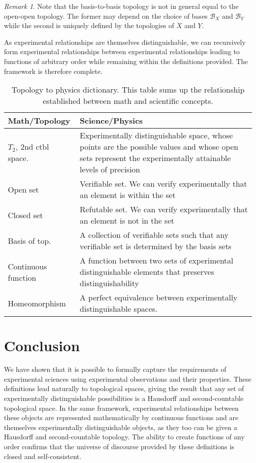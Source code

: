 \documentclass[review]{elsarticle}
\theoremstyle{plain}%
\theoremstyle{definition}
\theoremstyle{remark}
\newtheorem*{rem}{Remark}
\begin{document}
\begin{rem}
	Note that the basis-to-basis topology is not in general equal to the open-open topology. The former may depend on the choice of bases $\mathcal{B}_X$ and $\mathcal{B}_Y$ while the second is uniquely defined by the topologies of $X$ and $Y$.
\end{rem}

As experimental relationships are themselves distinguishable, we can recursively form experimental relationships between experimental relationships leading to functions of arbitrary order while remaining within the definitions provided. The framework is therefore complete.

\begin{table}[h]
	\centering
	\begin{tabular}{p{} p{}}
		Math/Topology & Science/Physics \\ 
		\hline 
		$T_2$, 2nd ctbl space. & Experimentally distinguishable space, whose points are the possible values and whose open sets represent the experimentally attainable levels of precision \\
		Open set & Verifiable set. We can verify experimentally that an element is within the set  \\ 
		Closed set & Refutable set. We can verify experimentally that an element is not in the set \\ 
		Basis of top. & A collection of verifiable sets such that any verifiable set is determined by the basis sets\\
		Continuous \newline function &  A function between two sets of experimental distinguishable elements that preserves distinguishability \\
		Homeomorphism &  A perfect equivalence between experimentally distinguishable spaces. \\
	\end{tabular} 
	\caption{Topology to physics dictionary. This table sums up the relationship established between math and scientific concepts.}
\end{table}


\section{Conclusion}

We have shown that it is possible to formally capture the requirements of experimental sciences using experimental observations and their properties. These definitions lead naturally to topological spaces, giving the result that any set of experimentally distinguishable possibilities is a Hausdorff and second-countable topological space. In the same framework, experimental relationships between these objects are represented mathematically by continuous functions and are themselves experimentally distinguishable objects, as they too can be given a Hausdorff and second-countable topology. The ability to create functions of any order confirms that the universe of discourse provided by these definitions is closed and self-consistent.
\end{document}
